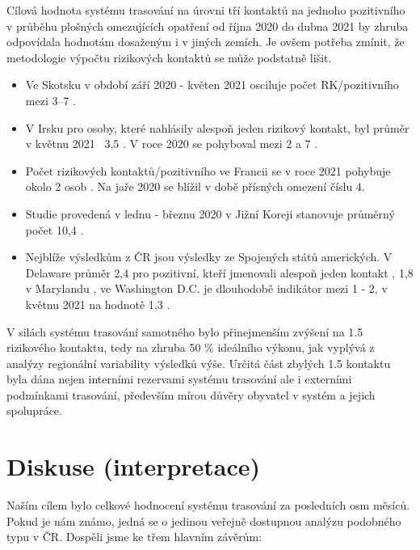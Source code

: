 Cílová hodnota systému trasování na úrovni tří kontaktů na jednoho pozitivního v průběhu plošných omezujících opatření od října 2020 do dubna 2021 by zhruba odpovídala hodnotám dosaženým i v jiných zemích. Je ovšem potřeba zmínit, že metodologie výpočtu rizikových kontaktů se může podstatně lišit. 
\begin{itemize}
\item Ve Skotsku v období září 2020 - květen 2021 osciluje počet RK/pozitivního mezi 3--7 \cite{tr_scotland01}.
\item V Irsku pro osoby, které nahlásily alespoň jeden rizikový kontakt, byl průměr v květnu 2021 ~3,5 \cite{tr_irland}. V roce 2020 se pohyboval mezi 2 a 7 \cite{tr_mcaloon_numbers_2021}.
\item Počet rizikových kontaktů/pozitivního ve Francii se v roce 2021 pohybuje okolo 2 osob \cite{tr_sante01}. Na jaře 2020 se blížil v době přísných omezení číslu 4.
\item Studie provedená v lednu - březnu 2020 v Jižní Koreji stanovuje průměrný počet 10,4 \cite{tr_park}.
\item Nejblíže výsledkům z ČR jsou výsledky ze Spojených států amerických. V Delaware průměr 2,4 pro pozitivní, kteří jmenovali alespoň jeden kontakt \cite{tr_Delaware}, 1,8 v Marylandu \cite{tr_maryland01}, ve Washington D.C. je dlouhodobě indikátor mezi 1 - 2, v květnu 2021 na hodnotě 1,3 \cite{tr_DC}.
\end{itemize}

V silách systému trasování samotného bylo přinejmenším zvýšení na 1.5 rizikového kontaktu, tedy na zhruba 50 \% ideálního výkonu, jak vyplývá z analýzy regionální variability výsledků výše. Určitá část zbylých 1.5 kontaktu byla dána nejen interními rezervami systému trasování ale i externími podmínkami trasování, především mírou důvěry obyvatel v systém a jejich spolupráce.

\section*{Diskuse (interpretace)}

Naším cílem bylo celkové hodnocení systému trasování za posledních osm měsíců. Pokud je nám známo, jedná se o jedinou veřejně dostupnou analýzu podobného typu v ČR. Dospěli jsme ke třem hlavním závěrům:

